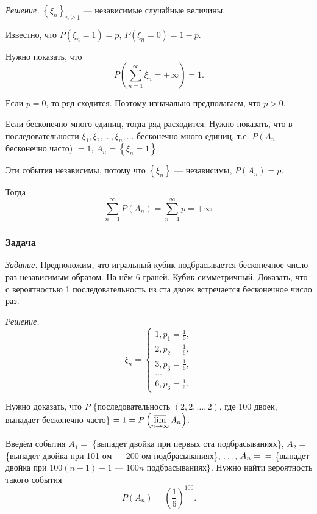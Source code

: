 \textit{Решение.} $ \left\{ \xi_n \right\}_{n \geq 1}$ --- независимые случайные величины.

Известно, что $P \left( \xi_n = 1 \right) = p, \, P \left( \xi_n = 0 \right) = 1 - p$.

Нужно показать, что
$$P \left( \sum \limits_{n=1}^{ \infty } \xi_n = + \infty \right) = 1.$$

Если $p = 0$, то ряд сходится.
Поэтому изначально предполагаем, что $p > 0$.

Если бесконечно много единиц, тогда ряд расходится.
Нужно показать,
что в последовательности $ \xi_1, \xi_2, \dotsc, \xi_n, \dotsc $ бесконечно много единиц,
т.е. $P \left( A_n \right.$ бесконечно часто) $= 1, \, A_n = \left\{ \xi_n = 1 \right\} $.

Эти события независимы, потому что $ \left\{ \xi_n \right\} $ --- независимы, $P \left( A_n \right) = p$.

Тогда
$$ \sum \limits_{n=1}^{ \infty } P \left( A_n \right) =
\sum \limits_{n=1}^{ \infty } p =
+ \infty.$$

\subsubsection*{Задача}

\textit{Задание.} Предположим, что игральный кубик подбрасывается бесконечное число раз независимым образом.
На нём 6 граней.
Кубик симметричный.
Доказать, что с вероятностью 1 последовательность из ста двоек встречается бесконечное число раз.

\textit{Решение.}
$$ \xi_n =
\begin{cases}
1, p_1 = \frac{1}{6}, \\
2, p_2 = \frac{1}{6}, \\
3, p_3 = \frac{1}{6}, \\
\dotsc \\
6, p_6 = \frac{1}{6}.
\end{cases}$$

Нужно доказать,
что $P$ \{последовательность $ \left( 2, 2, \dotsc, 2 \right) $, где 100 двоек, выпадает бесконечно часто\} $= 1 = P \left( \varlimsup \limits_{n \to \infty } A_n \right) $.

Введём события $A_1 =$ \{выпадет двойка при первых ста подбрасываниях\}, $A_2 =$ \{выпадет двойка при 101-ом --- 200-ом подбрасываниях\},
$ \dotsc, \, A_n =\\
=$ \{выпадет двойка при $100 \left( n-1 \right) + 1$ --- $100n$ подбрасываниях\}.
Нужно найти вероятность такого события
$$P \left( A_n \right) =
\left( \frac{1}{6} \right)^{100}.$$

